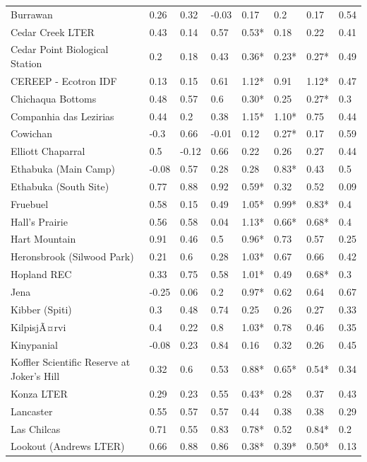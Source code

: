 \documentclass[twoside,12pt,final]{ucthesis-CA2012}
\begin{document}
\begin{ucmainmatter}
\begin{table}[ht]
{\begin{tabular}{llllllll}
  Burrawan & 0.26 & 0.32 & -0.03 & 0.17 & 0.2 & 0.17 & 0.54 \\ 
  Cedar Creek LTER & 0.43 & 0.14 & 0.57 & 0.53* & 0.18 & 0.22 & 0.41 \\ 
  Cedar Point Biological Station & 0.2 & 0.18 & 0.43 & 0.36* & 0.23* & 0.27* & 0.49 \\ 
  CEREEP - Ecotron IDF & 0.13 & 0.15 & 0.61 & 1.12* & 0.91 & 1.12* & 0.47 \\ 
  Chichaqua Bottoms & 0.48 & 0.57 & 0.6 & 0.30* & 0.25 & 0.27* & 0.3 \\ 
  Companhia das Lezirias & 0.44 & 0.2 & 0.38 & 1.15* & 1.10* & 0.75 & 0.44 \\ 
  Cowichan & -0.3 & 0.66 & -0.01 & 0.12 & 0.27* & 0.17 & 0.59 \\ 
  Elliott Chaparral & 0.5 & -0.12 & 0.66 & 0.22 & 0.26 & 0.27 & 0.44 \\ 
  Ethabuka (Main Camp) & -0.08 & 0.57 & 0.28 & 0.28 & 0.83* & 0.43 & 0.5 \\ 
  Ethabuka (South Site) & 0.77 & 0.88 & 0.92 & 0.59* & 0.32 & 0.52 & 0.09 \\ 
  Fruebuel & 0.58 & 0.15 & 0.49 & 1.05* & 0.99* & 0.83* & 0.4 \\ 
  Hall's Prairie & 0.56 & 0.58 & 0.04 & 1.13* & 0.66* & 0.68* & 0.4 \\ 
  Hart Mountain & 0.91 & 0.46 & 0.5 & 0.96* & 0.73 & 0.57 & 0.25 \\ 
  Heronsbrook (Silwood Park) & 0.21 & 0.6 & 0.28 & 1.03* & 0.67 & 0.66 & 0.42 \\ 
  Hopland REC & 0.33 & 0.75 & 0.58 & 1.01* & 0.49 & 0.68* & 0.3 \\ 
  Jena & -0.25 & 0.06 & 0.2 & 0.97* & 0.62 & 0.64 & 0.67 \\ 
  Kibber (Spiti) & 0.3 & 0.48 & 0.74 & 0.25 & 0.26 & 0.27 & 0.33 \\ 
  KilpisjÃ¤rvi & 0.4 & 0.22 & 0.8 & 1.03* & 0.78 & 0.46 & 0.35 \\ 
  Kinypanial & -0.08 & 0.23 & 0.84 & 0.16 & 0.32 & 0.26 & 0.45 \\ 
  Koffler Scientific Reserve at Joker's Hill & 0.32 & 0.6 & 0.53 & 0.88* & 0.65* & 0.54* & 0.34 \\ 
  Konza LTER & 0.29 & 0.23 & 0.55 & 0.43* & 0.28 & 0.37 & 0.43 \\ 
  Lancaster & 0.55 & 0.57 & 0.57 & 0.44 & 0.38 & 0.38 & 0.29 \\ 
  Las Chilcas & 0.71 & 0.55 & 0.83 & 0.78* & 0.52 & 0.84* & 0.2 \\ 
  Lookout (Andrews LTER) & 0.66 & 0.88 & 0.86 & 0.38* & 0.39* & 0.50* & 0.13 \\ 

\end{tabular}}
\end{table}
\end{ucmainmatter}
\end{document}
